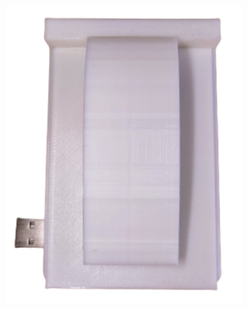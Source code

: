 \begin{figure}[H]
	\centering
	\begin{subfigure}[b]{0.45\textwidth}
		\centering
		\includegraphics[width=\textwidth]{img/Chap5/Prototype_View_above.png}
	\end{subfigure}
	\hfill
	\begin{subfigure}[b]{0.46\textwidth}
		\centering

\end{subfigure}
\end{figure}
